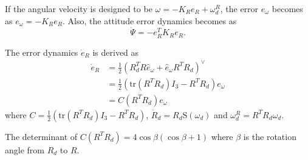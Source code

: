 \documentclass{article}
\begin{document}
If the angular velocity is designed to be $\omega = -K_Re_R + \omega_d^R$, the error $e_\omega$ becomes as $e_\omega = -K_Re_R$. Also, the attitude error dynamics becomes as
\begin{equation}
\dot{\Psi} = -e_R^TK_Re_R. \nonumber
\end{equation}

The error dynamics $\dot{e}_R$ is derived as
\begin{align}
\dot{e}_R &= \frac{1}{2}(R_d^T R \hat{e}_\omega +\hat{e}_\omega R^T R_d)^\vee \nonumber \\
&= \frac{1}{2}(\text{tr}(R^TR_d)I_3 - R^TR_d)e_\omega \nonumber \\
&= C(R^TR_d)e_\omega \nonumber
\end{align}
where $C =  \frac{1}{2}(\text{tr}(R^TR_d)I_3 - R^TR_d)$, $\dot{R}_d = R_d\text{S}(\omega_d)$ and $\omega_d^R = R^TR_d\omega_d$. 

The determinant of $C(R^TR_d) = 4\cos\beta(\cos\beta + 1)$ where $\beta$ is the rotation angle from $R_d$ to $R$.
\end{document}
